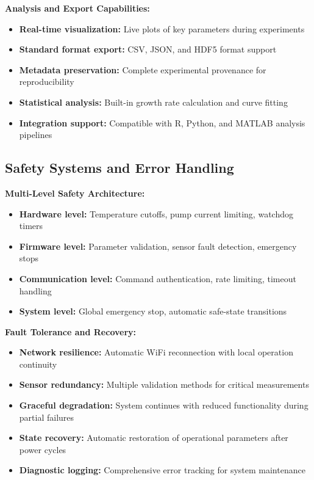 \textbf{Analysis and Export Capabilities:}
\begin{itemize}
\item \textbf{Real-time visualization:} Live plots of key parameters during experiments
\item \textbf{Standard format export:} CSV, JSON, and HDF5 format support
\item \textbf{Metadata preservation:} Complete experimental provenance for reproducibility
\item \textbf{Statistical analysis:} Built-in growth rate calculation and curve fitting
\item \textbf{Integration support:} Compatible with R, Python, and MATLAB analysis pipelines
\end{itemize}

\subsection{Safety Systems and Error Handling}

\textbf{Multi-Level Safety Architecture:}
\begin{itemize}
\item \textbf{Hardware level:} Temperature cutoffs, pump current limiting, watchdog timers
\item \textbf{Firmware level:} Parameter validation, sensor fault detection, emergency stops
\item \textbf{Communication level:} Command authentication, rate limiting, timeout handling
\item \textbf{System level:} Global emergency stop, automatic safe-state transitions
\end{itemize}

\textbf{Fault Tolerance and Recovery:}
\begin{itemize}
\item \textbf{Network resilience:} Automatic WiFi reconnection with local operation continuity
\item \textbf{Sensor redundancy:} Multiple validation methods for critical measurements
\item \textbf{Graceful degradation:} System continues with reduced functionality during partial failures
\item \textbf{State recovery:} Automatic restoration of operational parameters after power cycles
\item \textbf{Diagnostic logging:} Comprehensive error tracking for system maintenance
\end{itemize}


